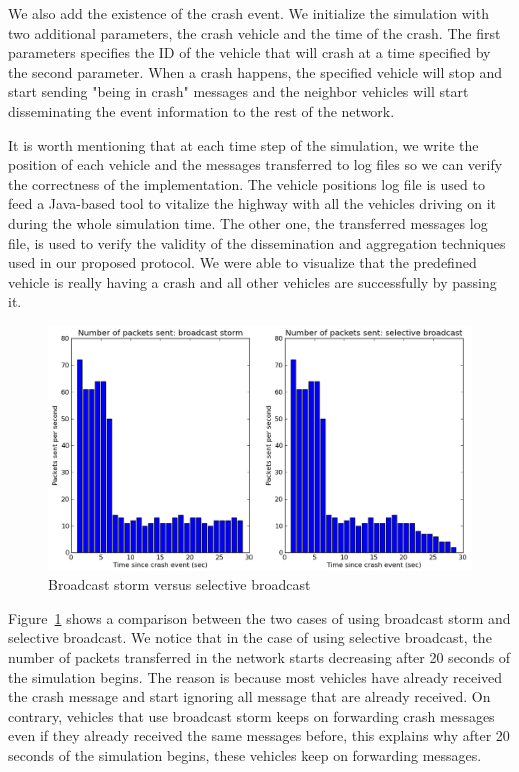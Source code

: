 \documentclass{IEEEtran}
\begin{document}
We also add the existence of the crash event. We initialize the simulation with two additional parameters, the crash vehicle and the time of the crash. The first parameters specifies the ID of the vehicle that will crash at a time specified by the second parameter. When a crash happens, the specified vehicle will stop and start sending "being in crash" messages and the neighbor vehicles will start disseminating the event information to the rest of the network.

It is worth mentioning that at each time step of the simulation, we write the position of each vehicle and the messages transferred to log files so we can verify the correctness of the implementation. The vehicle positions log file is used to feed a Java-based tool to vitalize the highway with all the vehicles driving on it during the whole simulation time. The other one, the transferred messages log file, is used to verify the validity of the dissemination and aggregation techniques used in our proposed protocol. We were able to visualize that the predefined vehicle is really having a crash and all other vehicles are successfully by passing it.

\noindent
\begin{figure}[h]
\centering
\includegraphics[scale=0.32]{Figure_01.png}
\caption{Broadcast storm versus selective broadcast}
\label{fig_storm_nostorm}
\end{figure}

Figure~\ref{fig_storm_nostorm} shows a comparison between the two cases of using broadcast storm and selective broadcast. We notice that in the case of using selective broadcast, the number of packets transferred in the network starts decreasing after 20 seconds of the simulation begins. The reason is because most vehicles have already received the crash message and start ignoring all message that are already received. On contrary, vehicles that use broadcast storm keeps on forwarding crash messages even if they already received the same messages before, this explains why after 20 seconds of the simulation begins, these vehicles keep on forwarding messages.
\end{document}
